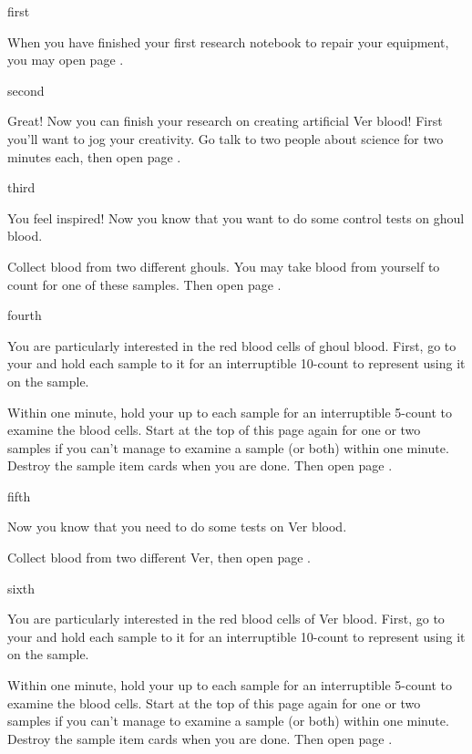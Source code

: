 \documentclass[greennotebook]{guildcamp4} %
\begin{document}
\startnotebook{\nJamesVerBlood{}}

\begin{page}{first}

When you have finished your first research notebook to repair your equipment, you may open page .

\end{page}

\begin{page}{second}

Great! Now you can finish your research on creating artificial Ver blood! First you'll want to jog your creativity. Go talk to two people about science for two minutes each, then open page .

\end{page}

\begin{page}{third}

You feel inspired! Now you know that you want to do some control tests on ghoul blood.

Collect blood from two different ghouls. You may take blood from yourself to count for one of these samples. Then open page .

\end{page}

\begin{page}{fourth}

You are particularly interested in the red blood cells of ghoul blood. First, go to your \sCentrifuge{} and hold each sample to it for an interruptible 10-count to represent using it on the sample.

Within one minute, hold your \iMicroscope{} up to each sample for an interruptible 5-count to examine the blood cells. Start  at the top of this page again for one or two samples if you can't manage to examine a sample (or both) within one minute. Destroy the sample item cards when you are done. Then open page .

\end{page}

\begin{page}{fifth}

Now you know that you need to do some tests on Ver blood.

Collect blood from two different Ver, then open page .

\end{page}

\begin{page}{sixth}

You are particularly interested in the red blood cells of Ver blood. First, go to your \sCentrifuge{} and hold each sample to it for an interruptible 10-count to represent using it on the sample.

Within one minute, hold your \iMicroscope{} up to each sample for an interruptible 5-count to examine the blood cells. Start  at the top of this page again for one or two samples if you can't manage to examine a sample (or both) within one minute. Destroy the sample item cards when you are done. Then open page .

\end{page}
\end{document}
